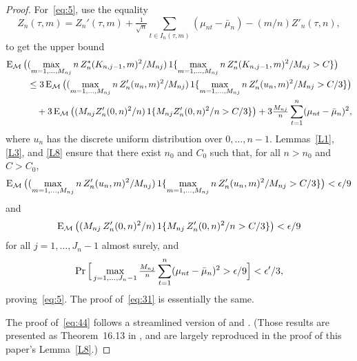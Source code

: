 \documentclass[11pt]{article}
\begin{document}
\begin{proof}
  For~\eqref{eq:5}, use the equality
  \begin{equation}
    Z_n(\tau, m) = Z_n'(\tau, m)
    + \tfrac{1}{\sqrt{n}} \sum_{t \in I_n(\tau, m)} (\mu_{nt} - \bar \mu_n)
    - (m/n) Z'_n(\tau, n), \label{eq:35}
  \end{equation}
  to get the upper bound
  \begin{align*}
    \operatorname{E}_{\mathcal{M}} \big ( & ( \max_{ m = 1, \dots, M_{nj} } n \, Z^*_n(K_{n,j-1},m)^2 / M_{nj} )
    \operatorname{1} \{ \max_{ m = 1, \dots, M_{nj} } n \, Z^*_n(K_{n,j-1}, m) ^2 / M_{nj} > C \} \big ) \\
    & \leq 3 \operatorname{E}_{\mathcal{M}} \big ( ( \max_{ m = 1, \dots, M_{nj} } n \, Z'_n(u_n,m)^2 / M_{nj} )
    \operatorname{1} \{ \max_{ m = 1, \dots, M_{nj} } n \, Z'_n(u_n,m)^2 / M_{nj} > C / 3 \} \big ) \\
    & \quad + 3 \operatorname{E}_{\mathcal{M}} \big ( ( M_{nj} Z'_n(0,n)^2 / n )
    \operatorname{1} \{ M_{nj} Z'_n(0,n)^2 / n > C / 3 \} \big )
    + 3 \tfrac{M_{nj}}{n} \sum_{t=1}^n ( \mu_{nt} - \bar \mu_n ) ^2,
  \end{align*}
  where $u_n$ has the discrete uniform distribution over $0,\dots,n-1$.
  Lemmas~\ref{L1}, \ref{L3}, and \ref{L8} ensure that there exist
  $n_0$ and $C_0$ such that, for all $n > n_0$ and $C > C_0$,
  \begin{equation*}
    \operatorname{E}_{\mathcal{M}} \big ( (\max_{ m = 1, \dots, M_{nj} } n \, Z'_n(u_n,m)^2 / M_{nj} )
    \operatorname{1} \{\max_{ m = 1, \dots, M_{nj} } n \, Z'_n(u_n,m)^2 / M_{nj} > C / 3 \}
    \big ) < \epsilon / 9
  \end{equation*}
  and
  \begin{equation*}
    \operatorname{E}_{\mathcal{M}} \big ( ( M_{nj} \, Z'_n(0,n)^2 / n )
    \operatorname{1} \{ M_{nj} \, Z'_n(0,n)^2 / n > C / 3 \} \big )
    < \epsilon / 9
  \end{equation*}
  for all $j = 1,\dots,J_n - 1$ almost surely, and
  \begin{equation*}
    \operatorname{Pr} \Big [ \max_{j=1,\dots,J_n-1}
    \tfrac{M_{nj}}{n} \sum_{t=1}^n ( \mu_{nt} - \bar \mu_n )^2 > \epsilon / 9 \Big ]
    < \epsilon' / 3,
  \end{equation*}
  proving~\eqref{eq:5}. The proof of~\eqref{eq:31} is essentially the same.

  The proof of~\eqref{eq:44} follows a streamlined version of \citet[Lemma
  6.5]{Mcl:75b} and \citet[Lemma 3.5]{Mcl:77}. (Those results are
  presented as Theorem~16.13 in \citealp{Dav:94}, and are largely
  reproduced in the proof of this paper's Lemma~\ref{L8}.)


\end{proof}
\end{document}
